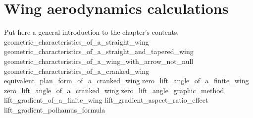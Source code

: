 \documentclass[[12pt,twoside]{book}
\begin{document}
%
%
\chapter%
   [Wing aerodynamics calculations]%
   {Wing aerodynamics calculations}
\label{chap:Wing}

\setcounter{minitocdepth}{2}%
\minitoc %

\vspace{\baselineskip}

\noindent
Put here a general introduction to the chapter's contents.
%
{geometric_characteristics_of_a_straight_wing}
{geometric_characteristics_of_a_straight_and_tapered_wing}
{geometric_characteristics_of_a_wing_with_arrow_not_null}
{geometric_characteristics_of_a_cranked_wing}
{equivalent_plan_form_of_a_cranked_wing}
{zero_lift_angle_of_a_finite_wing}
{zero_lift_angle_of_a_cranked_wing}
{zero_lift_angle_graphic_method}
{lift_gradient_of_a_finite_wing}
{lift_gradient_aspect_ratio_effect}
{lift_gradient_polhamus_formula}
\end{document}
